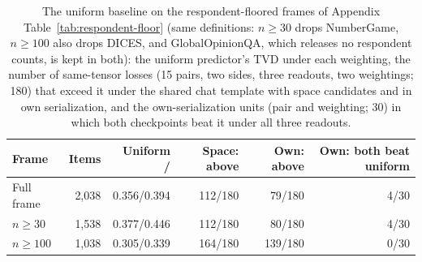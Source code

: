 \begin{table}[t]
\centering\scriptsize
\setlength{\tabcolsep}{2.5pt}
\begin{tabular}{@{}lrrrrr@{}}
\toprule
Frame & Items & Uniform \ES{}/\PC{} & Space: above & Own: above & Own: both beat uniform \\
\midrule
Full frame & 2,038 & 0.356/0.394 & 112/180 & 79/180 & 4/30 \\
$n\ge30$ & 1,538 & 0.377/0.446 & 112/180 & 80/180 & 4/30 \\
$n\ge100$ & 1,038 & 0.305/0.339 & 164/180 & 139/180 & 0/30 \\
\bottomrule
\end{tabular}
\caption{The uniform baseline on the respondent-floored frames of Appendix Table~\ref{tab:respondent-floor} (same definitions: $n\ge30$ drops NumberGame, $n\ge100$ also drops DICES, and GlobalOpinionQA, which releases no respondent counts, is kept in both): the uniform predictor's TVD under each weighting, the number of same-tensor losses (15 pairs, two sides, three readouts, two weightings; 180) that exceed it under the shared chat template with space candidates and in own serialization, and the own-serialization units (pair and weighting; 30) in which both checkpoints beat it under all three readouts.}
\label{tab:uniform-floor}
\end{table}
